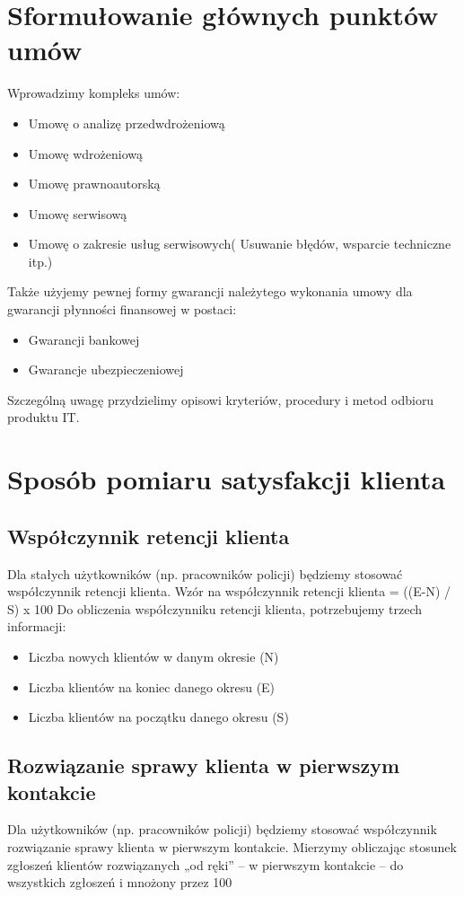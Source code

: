 \documentclass[12pt]{article}
\begin{document}
\section{Sformułowanie głównych punktów umów}

Wprowadzimy kompleks umów:
	\begin{itemize}
 	\item Umowę o analizę przedwdrożeniową
 	\item Umowę wdrożeniową
	\item Umowę prawnoautorską
 	\item Umowę serwisową
 	\item Umowę o zakresie usług serwisowych( Usuwanie błędów, wsparcie techniczne itp.)
 	\end{itemize}
 Także użyjemy pewnej formy gwarancji należytego wykonania umowy  dla gwarancji  płynności finansowej w postaci:
 \begin{itemize}
 \item Gwarancji bankowej
 \item Gwarancje ubezpieczeniowej
 \end{itemize}
Szczególną uwagę przydzielimy opisowi kryteriów, procedury i metod odbioru produktu IT.


\section{Sposób pomiaru satysfakcji klienta}

\subsection*{Współczynnik retencji klienta}
Dla stałych użytkowników (np. pracowników policji) będziemy stosować współczynnik retencji klienta.
Wzór na współczynnik retencji klienta = ((E-N) / S) x 100
Do obliczenia współczynniku retencji klienta, potrzebujemy trzech informacji:
\begin{itemize}
	\item Liczba nowych klientów w danym okresie (N)
	\item Liczba klientów na koniec danego okresu (E)
	\item Liczba klientów na początku danego okresu (S)
\end{itemize}

\subsection*{Rozwiązanie sprawy klienta w pierwszym kontakcie}
Dla użytkowników (np. pracowników policji) będziemy stosować współczynnik rozwiązanie sprawy klienta w pierwszym kontakcie.
Mierzymy obliczając stosunek zgłoszeń klientów rozwiązanych „od ręki” – w pierwszym kontakcie – do wszystkich zgłoszeń i mnożony przez 100%
\end{document}

